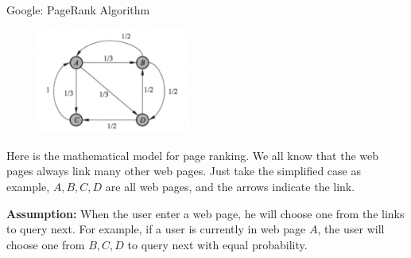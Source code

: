 \documentclass{beamer}
\begin{document}
\begin{frame}{Google: PageRank Algorithm}
    \begin{figure}
        \centering
        \includegraphics[width=0.45\textwidth]{pr.png}
    \end{figure}

Here is the mathematical model for page ranking. We all know that the web pages always link many other web pages. Just take the simplified case as example, $A,B,C,D$ are all web pages, and the arrows indicate the link.

\vspace{3pt}
\textbf{Assumption:} When the user enter a web page, he will choose one from the links to query next. For example, if a user is currently in web page $A$, the user will choose one from $B,C,D$ to query next with equal probability.
\end{frame}
\end{document}
